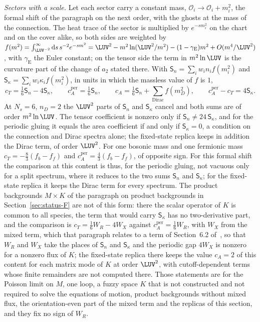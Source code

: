 \emph{Sectors with a scale.} Let each sector carry a constant mass, \(\mathcal O_i\to\mathcal O_i+m_i^2\), the formal shift of the paragraph on the next order, with the ghosts at the mass of the connection. The heat trace of the sector is multiplied by \(e^{-sm_i^2}\) on the chart and on the cover alike, so both sides are weighted by \(f(m^2)=\int_{\LUV^{-2}}^\infty\mathrm ds\,s^{-2}e^{-sm^2}=\LUV^2-m^2\ln(\LUV^2/m^2)-(1-\gamma_{\mathrm E})m^2+O(m^4/\LUV^2)\), with \(\gamma_{\mathrm E}\) the Euler constant; on the tensor side the term in \(m^2\ln\LUV\) is the curvature part of the change of \(a_2\) stated there. With \(\mathsf S_n=\sum_iw_in_if(m_i^2)\) and \(\mathsf S_\kappa=\sum_iw_i\kappa_if(m_i^2)\), in units in which the massless value of \(f\) is \(1\),
\[
  c_T=\tfrac16\mathsf S_n-4\mathsf S_\kappa,\qquad c_A^{\mathrm{per}}=\tfrac16\mathsf S_n,\qquad c_A=\tfrac16\mathsf S_n+\sum_{\text{Dirac}}f(m_D^2),\qquad c_A^{\mathrm{per}}-c_T=4\mathsf S_\kappa .
\]
At \(N_s=6\), \(n_D=2\) the \(\LUV^2\) parts of \(\mathsf S_n\) and \(\mathsf S_\kappa\) cancel and both sums are of order \(m^2\ln\LUV\). The tensor coefficient is nonzero only if \(\mathsf S_n\neq24\,\mathsf S_\kappa\), and for the periodic gluing it equals the area coefficient if and only if \(\mathsf S_\kappa=0\), a condition on the connection and Dirac spectra alone; the fixed-state replica keeps in addition the Dirac term, of order \(\LUV^2\). For one bosonic mass and one fermionic mass \(c_T=-\tfrac83(f_b-f_f)\) and \(c_A^{\mathrm{per}}=\tfrac43(f_b-f_f)\), of opposite sign. For this formal shift the comparison at this content is thus, for the periodic gluing, not vacuous only for a split spectrum, where it reduces to the two sums \(\mathsf S_n\) and \(\mathsf S_\kappa\); for the fixed-state replica it keeps the Dirac term for every spectrum. The product backgrounds \(M\times K\) of the paragraph on product backgrounds in Section~\ref{sec:status-F} are not of this form: there the scalar operator of \(K\) is common to all species, the term that would carry \(\mathsf S_\kappa\) has no two-derivative part, and the comparison is \(c_T=\tfrac16W_R-4W_X\) against \(c_A^{\mathrm{per}}=\tfrac16W_R\), with \(W_X\) from the mixed term, which that paragraph relates to a term of Section~6.2 of~\cite{Steinacker2023}, so that \(W_R\) and \(W_X\) take the places of \(\mathsf S_n\) and \(\mathsf S_\kappa\) and the periodic gap \(4W_X\) is nonzero for a nonzero flux of \(K\); the fixed-state replica there keeps the value \(c_A=2\) of this content for each matrix mode of \(K\) at order \(\LUV^2\), with cutoff-dependent terms whose finite remainders are not computed there. Those statements are for the Poisson limit on \(M\), one loop, a fuzzy space \(K\) that is not constructed and not required to solve the equations of motion, product backgrounds without mixed flux, the orientation-even part of the mixed term and the replicas of this section, and they fix no sign of \(W_R\).


